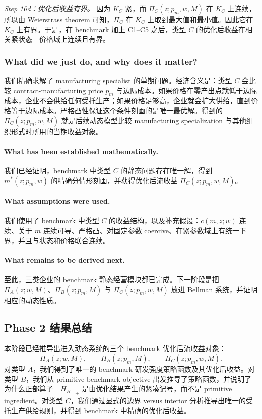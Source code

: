 \textit{Step 10d：优化后收益有界。}
因为 $K_C$ 紧，而 $\Pi_C(z;p_m,w,M)$ 在 $K_C$ 上连续，所以由 Weierstrass theorem 可知，$\Pi_C$ 在 $K_C$ 上取到最大值和最小值。因此它在 $K_C$ 上有界。于是，在 benchmark 加上 C1--C5 之后，类型 $C$ 的优化后收益在相关紧状态—价格域上连续且有界。

\subsubsection*{What did we just do, and why does it matter?}
我们精确求解了 manufacturing specialist 的单期问题。经济含义是：类型 $C$ 会比较 contract-manufacturing price $p_m$ 与边际成本。如果价格在零产出点就低于边际成本，企业不会供给任何受托生产；如果价格足够高，企业就会扩大供给，直到价格等于边际成本。严格凸性保证这个条件刻画的是唯一最优解。得到的 $\Pi_C(z;p_m,w,M)$ 就是后续动态模型比较 manufacturing specialization 与其他组织形式时所用的当期收益对象。

\paragraph{What has been established mathematically.}
我们已经证明，benchmark 中类型 $C$ 的静态问题存在唯一解，得到 $m^*(z;p_m,w)$ 的精确分情形刻画，并获得优化后流收益 $\Pi_C(z;p_m,w,M)$。

\paragraph{What assumptions were used.}
我们使用了 benchmark 中类型 $C$ 的收益结构，以及补充假设：$c(m,z;w)$ 连续、关于 $m$ 连续可导、严格凸、对固定参数 coercive、在紧参数域上有统一下界，并且与状态和价格联合连续。

\paragraph{What remains to be derived next.}
至此，三类企业的 benchmark 静态经营模块都已完成。下一阶段是把 $\Pi_A(z;w,M)$、$\Pi_B(z;p_m,M)$ 与 $\Pi_C(z;p_m,w,M)$ 放进 Bellman 系统，并证明相应的动态性质。

\subsection{Phase 2 结果总结}

本阶段已经推导出进入动态系统的三个 benchmark 优化后流收益对象：
\[
\Pi_A(z;w,M),\qquad \Pi_B(z;p_m,M),\qquad \Pi_C(z;p_m,w,M).
\]
对类型 $A$，我们得到了唯一的 benchmark 研发强度策略函数及其优化后收益。对类型 $B$，我们从 primitive benchmark objective 出发推导了策略函数，并说明了为什么正部算子 $[H_B]_+$ 是由优化结果产生的紧凑记号，而不是 primitive ingredient。对类型 $C$，我们通过显式的边界 versus interior 分析推导出唯一的受托生产供给规则，并得到 benchmark 中精确的优化后收益。

